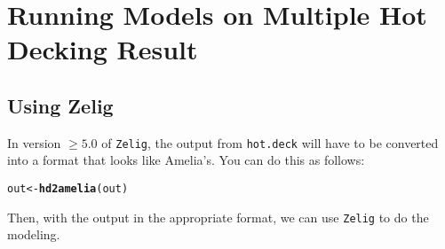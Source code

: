 \documentclass[12pt]{article}\usepackage[]{graphicx}\usepackage[]{color}
\makeatletter
\newcommand{\hlstd}[1]{\textcolor[rgb]{0.345,0.345,0.345}{#1}}%
\newcommand{\hlkwb}[1]{\textcolor[rgb]{0.69,0.353,0.396}{#1}}%
\newcommand{\hlkwd}[1]{\textcolor[rgb]{0.737,0.353,0.396}{\textbf{#1}}}%
\newenvironment{kframe}{%
 \def\at@end@of@kframe{}%
 \ifinner\ifhmode%
  \def\at@end@of@kframe{\end{minipage}}%
  \begin{minipage}{\columnwidth}%
 \fi\fi%
 \def\FrameCommand##1{\hskip\@totalleftmargin \hskip-\fboxsep
 \colorbox{shadecolor}{##1}\hskip-\fboxsep
     \hskip-\linewidth \hskip-\@totalleftmargin \hskip\columnwidth}%
 \MakeFramed {\advance\hsize-\width
   \@totalleftmargin\z@ \linewidth\hsize
   \@setminipage}}%
 {\par\unskip\endMakeFramed%
 \at@end@of@kframe}
\newenvironment{knitrout}{}{} %
\makeatother
\begin{document}
\section{Running Models on Multiple Hot Decking Result}

\subsection{Using Zelig}

In version $\geq 5.0$ of \verb"Zelig", the output from \verb"hot.deck" will have to be converted into a format that looks like Amelia's.  You can do this as follows: 

\begin{knitrout}
\color{fgcolor}\begin{kframe}
\begin{alltt}
\hlstd{out} \hlkwb{<-} \hlkwd{hd2amelia}\hlstd{(out)}
\end{alltt}
\end{kframe}
\end{knitrout}

\noindent Then, with the output in the appropriate format, we can use \verb"Zelig" to do the modeling. 
\end{document}
